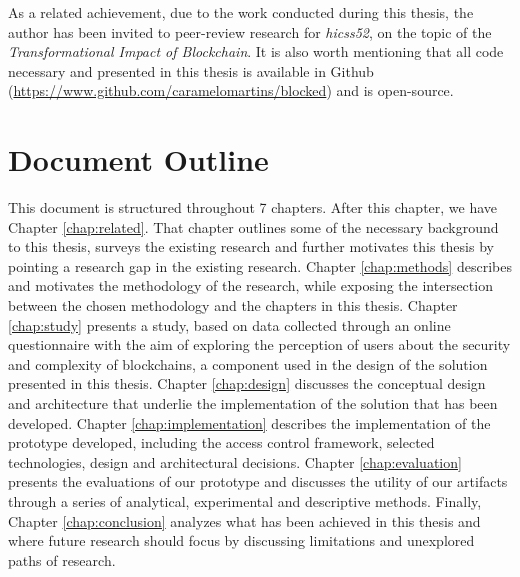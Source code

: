 As a related achievement, due to the work conducted during this thesis, the author has been invited to peer-review research for \textit{\glsdesc{hicss52}}, on the topic of the \textit{Transformational Impact of Blockchain}. It is also worth mentioning that all code necessary and presented in this thesis is available in Github (\url{https://www.github.com/caramelomartins/blocked}) and is open-source.

\section{Document Outline}

This document is structured throughout 7 chapters. After this chapter, we have Chapter \ref{chap:related}. That chapter outlines some of the necessary background to this thesis, surveys the existing research and further motivates this thesis by pointing a research gap in the existing research. Chapter \ref{chap:methods} describes and motivates the methodology of the research, while exposing the intersection between the chosen methodology and the chapters in this thesis. Chapter \ref{chap:study} presents a study, based on data collected through an online questionnaire with the aim of exploring the perception of users about the security and complexity of blockchains, a component used in the design of the solution presented in this thesis. Chapter \ref{chap:design} discusses the conceptual design and architecture that underlie the implementation of the solution that has been developed. Chapter \ref{chap:implementation} describes the implementation of the prototype developed, including the access control framework, selected technologies, design and architectural decisions. Chapter \ref{chap:evaluation} presents the evaluations of our prototype and discusses the utility of our artifacts through a series of analytical, experimental and descriptive methods. Finally, Chapter \ref{chap:conclusion} analyzes what has been achieved in this thesis and where future research should focus by discussing limitations and unexplored paths of research.
